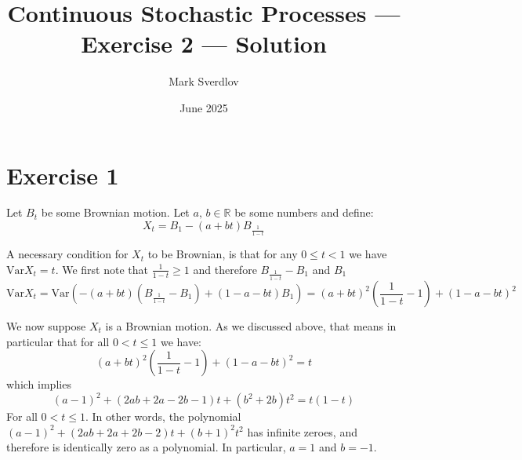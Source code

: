 \documentclass{amsart}
\title{Continuous Stochastic Processes --- Exercise 2 --- Solution}
\author{Mark Sverdlov}
\date{June 2025}
\theoremstyle{plain}
\theoremstyle{definition}
\theoremstyle{definition}
\theoremstyle{remark}
\begin{document}
    \maketitle
    \section{Exercise 1}
    Let \(B_{t}\) be some Brownian motion. Let \(a,\,b\in \mathbb{R}\) be some numbers and define:
    \begin{equation*}
        X_{t} = B_{1} - \left( a+bt \right)B_{\frac{1}{1-t}}
    \end{equation*}

A necessary condition for \(X_{t}\) to be Brownian, is that for any \(0\leq t < 1\) we have \(\mathrm{Var}X_{t} = t\). We first note that \(\frac{1}{1-t} \geq 1\) and therefore \(B_{\frac{1}{1-t}}-B_{1}\) and \(B_{1}\)
\begin{equation*}
    \mathrm{Var}X_{t} = \mathrm{Var} \left(-\left(a+bt\right)\left(B_{\frac{1}{1-t}}-B_{1}\right)+\left(1-a-bt\right)B_{1}\right)=\left(a+bt\right)^{2}\left(\frac{1}{1-t}-1\right)+\left(1-a-bt\right)^{2}
\end{equation*}


We now suppose \(X_{t}\) is a Brownian motion. As we discussed above, that means in particular that for all \(0 < t \leq 1\) we have:
\begin{equation*}
    \left(a+bt\right)^{2}\left(\frac{1}{1-t}-1\right)+\left(1-a-bt\right)^{2} = t
\end{equation*}
which implies
\begin{equation}
    \label{eq:2}
    \left(a-1\right)^{2}+\left(2ab+2a-2b-1\right)t+\left(b^{2}+2b\right)t^{2} = t \left(1-t\right)
\end{equation}
For all \(0<t\leq 1\). In other words, the polynomial \(\left(a-1\right)^{2}+\left(2ab+2a+2b-2\right)t+\left(b+1\right)^{2}t^{2}\) has infinite zeroes, and therefore is identically zero as a polynomial. In particular, \(a=1\) and \(b=-1\).
\end{document}
